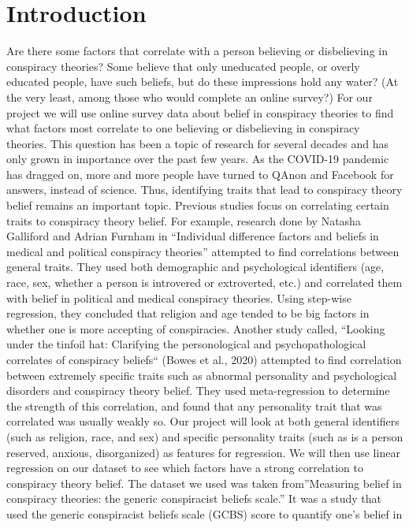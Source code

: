 \documentclass[11pt]{article}
\begin{document}
\section*{Introduction} Are there some factors that correlate with a person
believing or disbelieving in conspiracy theories? Some believe that only
uneducated people, or overly educated people, have such beliefs, but do
these impressions hold any water? (At the very least, among those who
would complete an online survey?) For our project we will use online
survey data about belief in conspiracy theories to find what factors
most correlate to one believing or disbelieving in conspiracy theories.
This question has been a topic of research for several decades and has
only grown in importance over the past few years. As the COVID-19
pandemic has dragged on, more and more people have turned to QAnon and
Facebook for answers, instead of science. Thus, identifying traits that
lead to conspiracy theory belief remains an important topic. Previous
studies focus on correlating certain traits to conspiracy theory belief.
For example, research done by Natasha Galliford and Adrian Furnham in
``Individual difference factors and beliefs in medical and political
conspiracy theories'' attempted to find correlations between general
traits. They used both demographic and psychological identifiers (age,
race, sex, whether a person is introvered or extroverted, etc.) and
correlated them with belief in political and medical conspiracy
theories. Using step-wise regression, they concluded that religion and
age tended to be big factors in whether one is more accepting of
conspiracies. Another study called, ``Looking under the tinfoil hat:
Clarifying the personological and psychopathological correlates of
conspiracy beliefs`` (Bowes et al., 2020) attempted to find correlation
between extremely specific traits such as abnormal personality and
psychological disorders and conspiracy theory belief. They used
meta-regression to determine the strength of this correlation, and found
that any personality trait that was correlated was usually weakly so.
Our project will look at both general identifiers (such as religion,
race, and sex) and specific personality traits (such as is a person
reserved, anxious, disorganized) as features for regression. We will
then use linear regression on our dataset to see which factors have a
strong correlation to conspiracy theory belief. The dataset we used was
taken from''Measuring belief in conspiracy theories: the generic
conspiracist beliefs scale.'' It was a study that used the generic
conspiracist beliefs scale (GCBS) score to quantify one's belief in
\end{document}
